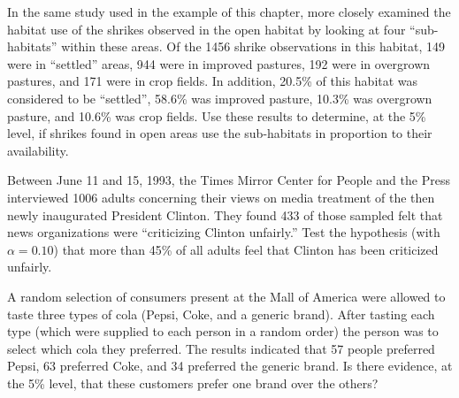 \documentclass[10pt,openany]{book}\usepackage[]{graphicx}\usepackage[]{color}
\begin{document}
\newpage
\begin{exsection}
  \item \label{revex:ChiGOFShrike} In the same study used in the example of this chapter, \cite{BohallWood1987} more closely examined the habitat use of the shrikes observed in the open habitat by looking at four ``sub-habitats'' within these areas.  Of the 1456 shrike observations in this habitat, 149 were in ``settled'' areas, 944 were in improved pastures, 192 were in overgrown pastures, and 171 were in crop fields.  In addition, 20.5\% of this habitat was considered to be ``settled'', 58.6\% was improved pasture, 10.3\% was overgrown pasture, and 10.6\% was crop fields.    Use these results to determine, at the 5\% level, if shrikes found in open areas use the sub-habitats in proportion to their availability. 

  \item \label{revex:ChiGOFClinton} Between June 11 and 15, 1993, the Times Mirror Center for People and the Press interviewed 1006 adults concerning their views on media treatment of the then newly inaugurated President Clinton.  They found 433 of those sampled felt that news organizations were ``criticizing Clinton unfairly.''  Test the hypothesis (with $\alpha=0.10$) that more than 45\% of all adults feel that Clinton has been criticized unfairly. 

  \item \label{revex:ChiGOFPref2} A random selection of consumers present at the Mall of America were allowed to taste three types of cola (Pepsi, Coke, and a generic brand).  After tasting each type (which were supplied to each person in a random order) the person was to select which cola they preferred.  The results indicated that 57 people preferred Pepsi, 63 preferred Coke, and 34 preferred the generic brand.  Is there evidence, at the 5\% level, that these customers prefer one brand over the others? 


\end{exsection}
\end{document}
